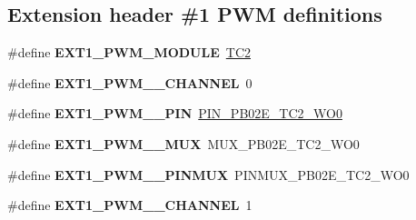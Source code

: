 \subsection*{Extension header \#1 P\+W\+M definitions}
\begin{DoxyCompactItemize}
\item 
\hypertarget{group__saml21__xplained__pro__features__group_ga17be406af2b3ea3f95811b573de0b4a8}{}\#define {\bfseries E\+X\+T1\+\_\+\+P\+W\+M\+\_\+\+M\+O\+D\+U\+L\+E}~\hyperlink{group___s_a_m_l21_j18_a__base_ga1a7cd5e0e5b3b37a78ffd38fdcf468ab}{T\+C2}\label{group__saml21__xplained__pro__features__group_ga17be406af2b3ea3f95811b573de0b4a8}

\item 
\hypertarget{group__saml21__xplained__pro__features__group_ga60838473cc32e6d0ba4751e3a2f1b5c0}{}\#define {\bfseries E\+X\+T1\+\_\+\+P\+W\+M\+\_\+\_\+\+C\+H\+A\+N\+N\+E\+L}~0\label{group__saml21__xplained__pro__features__group_ga60838473cc32e6d0ba4751e3a2f1b5c0}

\item 
\hypertarget{group__saml21__xplained__pro__features__group_ga9aa2d5165f8d3906e4910d119ef59980}{}\#define {\bfseries E\+X\+T1\+\_\+\+P\+W\+M\+\_\+\_\+\+P\+I\+N}~\hyperlink{pio_2saml21j18a_8h_ae9f946cb202437b0bf35521463b77703}{P\+I\+N\+\_\+\+P\+B02\+E\+\_\+\+T\+C2\+\_\+\+W\+O0}\label{group__saml21__xplained__pro__features__group_ga9aa2d5165f8d3906e4910d119ef59980}

\item 
\hypertarget{group__saml21__xplained__pro__features__group_gac923210c50489df59fac85fcfc6d945f}{}\#define {\bfseries E\+X\+T1\+\_\+\+P\+W\+M\+\_\+\_\+\+M\+U\+X}~M\+U\+X\+\_\+\+P\+B02\+E\+\_\+\+T\+C2\+\_\+\+W\+O0\label{group__saml21__xplained__pro__features__group_gac923210c50489df59fac85fcfc6d945f}

\item 
\hypertarget{group__saml21__xplained__pro__features__group_ga01ad2224572edd5f5b0dafe90483d462}{}\#define {\bfseries E\+X\+T1\+\_\+\+P\+W\+M\+\_\+\_\+\+P\+I\+N\+M\+U\+X}~P\+I\+N\+M\+U\+X\+\_\+\+P\+B02\+E\+\_\+\+T\+C2\+\_\+\+W\+O0\label{group__saml21__xplained__pro__features__group_ga01ad2224572edd5f5b0dafe90483d462}

\item 
\hypertarget{group__saml21__xplained__pro__features__group_ga9b01ee479eda0b3b277d642a20ed6aea}{}\#define {\bfseries E\+X\+T1\+\_\+\+P\+W\+M\+\_\+\_\+\+C\+H\+A\+N\+N\+E\+L}~1\label{group__saml21__xplained__pro__features__group_ga9b01ee479eda0b3b277d642a20ed6aea}


\end{DoxyCompactItemize}
